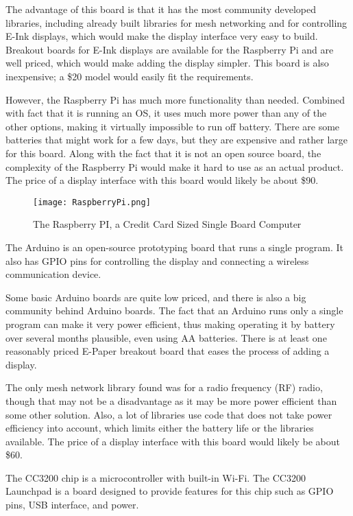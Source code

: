 \documentclass[PPFS.tex]{template/subfiles}
\begin{document}
The advantage of this board is that it has the most community developed libraries, including already built libraries for mesh networking and for controlling E-Ink displays, which would make the display interface very easy to build. Breakout boards for E-Ink displays are available for the Raspberry Pi and are well priced, which would make adding the display simpler. This board is also inexpensive; a \$20 model would easily fit the requirements.

However, the Raspberry Pi has much more functionality than needed. Combined with fact that it is running an OS, it uses much more power than any of the other options, making it virtually impossible to run off battery. There are some batteries that might work for a few days, but they are expensive and rather large for this board. Along with the fact that it is not an open source board, the complexity of the Raspberry Pi would make it hard to use as an actual product. The price of a display interface with this board would likely be about \$90.

\begin{figure}[h]
	\centering
	\texttt{[image: RaspberryPi.png]}
	\caption{The Raspberry PI, a Credit Card Sized Single Board Computer}
	\label{fig:raspberryPi}
\end{figure}

The Arduino is an open-source prototyping board that runs a single program. It also has GPIO pins for controlling the display and connecting a wireless communication device.

Some basic Arduino boards are quite low priced, and there is also a big community behind Arduino boards. The fact that an Arduino runs only a single program can make it very power efficient, thus making operating it by battery over several months plausible, even using AA batteries. There is at least one reasonably priced E-Paper breakout board that eases the process of adding a display.

The only mesh network library found was for a radio frequency (RF) radio, though that may not be a disadvantage as it may be more power efficient than some other solution. Also, a lot of libraries use code that does not take power efficiency into account, which limits either the battery life or the libraries available. The price of a display interface with this board would likely be about \$60.

The CC3200 chip is a microcontroller with built-in Wi-Fi. The CC3200 Launchpad is a board designed to provide features for this chip such as GPIO pins, USB interface, and power.
\end{document}
